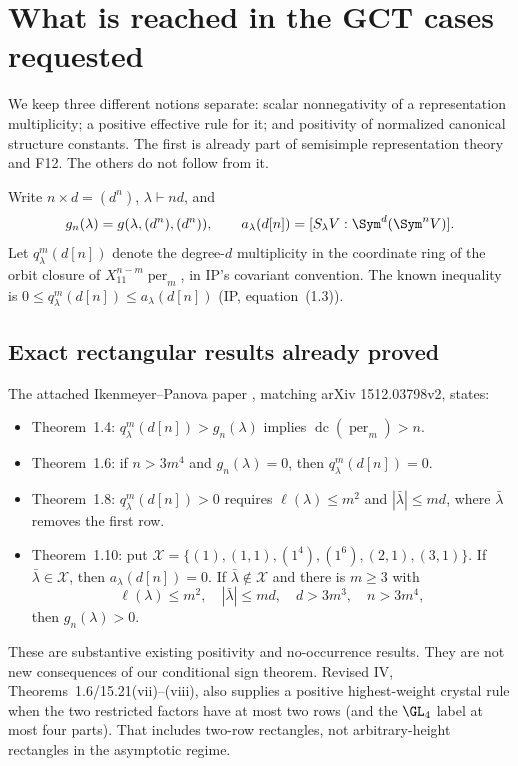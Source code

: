 \documentclass[11pt,a4paper]{article}
\newcommand{\fid}[1]{\textsf{#1}}\newcommand{\gate}[1]{\textsf{#1}}
\theoremstyle{named}\newtheorem{finding}{Finding}[section]
\theoremstyle{definition}\newtheorem{definition}[finding]{Definition}
\theoremstyle{remark}\newtheorem{remark}[finding]{Remark}
\begin{document}
\section{What is reached in the GCT cases requested}\label{sec:rectangles}
We keep three different notions separate: scalar nonnegativity of a representation multiplicity; a positive effective rule for it; and positivity of normalized canonical structure constants. The first is already part of semisimple representation theory and \fid{F12}. The others do not follow from it.

Write $n\times d=(d^n)$, $\lambda\vdash nd$, and
\[
 g_n(\lambda)=g(\lambda,(d^n),(d^n)),\qquad
 a_\lambda(d[n])=[S_\lambda V:\Sym^d(\Sym^nV)].
\]
Let $q^m_\lambda(d[n])$ denote the degree-$d$ multiplicity in the coordinate ring of the orbit closure of $X_{11}^{n-m}\operatorname{per}_m$, in IP's covariant convention. The known inequality is $0\le q^m_\lambda(d[n])\le a_\lambda(d[n])$ (IP, equation~(1.3)).

\subsection{Exact rectangular results already proved}
The attached Ikenmeyer--Panova paper \cite{IP}, matching arXiv 1512.03798v2, states:
\begin{itemize}
\item Theorem~1.4: $q^m_\lambda(d[n])>g_n(\lambda)$ implies $\operatorname{dc}(\operatorname{per}_m)>n$.
\item Theorem~1.6: if $n>3m^4$ and $g_n(\lambda)=0$, then $q^m_\lambda(d[n])=0$.
\item Theorem~1.8: $q^m_\lambda(d[n])>0$ requires $\ell(\lambda)\le m^2$ and $|\bar\lambda|\le md$, where $\bar\lambda$ removes the first row.
\item Theorem~1.10: put
$\mathcal X=\{(1),(1,1),(1^4),(1^6),(2,1),(3,1)\}$.
If $\bar\lambda\in\mathcal X$, then $a_\lambda(d[n])=0$. If $\bar\lambda\notin\mathcal X$ and there is $m\ge3$ with
\[
 \ell(\lambda)\le m^2,\quad |\bar\lambda|\le md,\quad
 d>3m^3,\quad n>3m^4,
\]
then $g_n(\lambda)>0$.
\end{itemize}
These are substantive existing positivity and no-occurrence results. They are not new consequences of our conditional sign theorem. Revised IV, Theorems~1.6/15.21(vii)--(viii), also supplies a positive highest-weight crystal rule when the two restricted factors have at most two rows (and the $\GL_4$ label at most four parts). That includes two-row rectangles, not arbitrary-height rectangles in the asymptotic regime.
\end{document}

